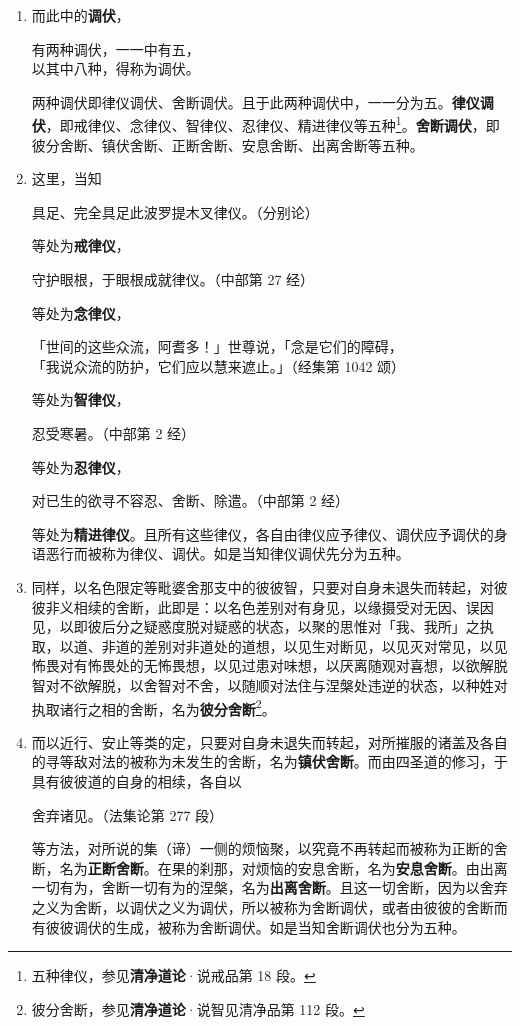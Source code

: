 \begin{enumerate}
\item 而此中的\textbf{调伏}，\begin{quoting}有两种调伏，一一中有五，\\以其中八种，得称为调伏。\end{quoting}两种调伏即律仪调伏、舍断调伏。且于此两种调伏中，一一分为五。\textbf{律仪调伏}，即戒律仪、念律仪、智律仪、忍律仪、精进律仪等五种\footnote{五种律仪，参见\textbf{清净道论}·说戒品第 18 段。}。\textbf{舍断调伏}，即彼分舍断、镇伏舍断、正断舍断、安息舍断、出离舍断等五种。
\item 这里，当知\begin{quoting}具足、完全具足此波罗提木叉律仪。（分别论）\end{quoting}等处为\textbf{戒律仪}，\begin{quoting}守护眼根，于眼根成就律仪。（中部第 27 经）\end{quoting}等处为\textbf{念律仪}，\begin{quoting}「世间的这些众流，阿耆多！」世尊说，「念是它们的障碍，\\「我说众流的防护，它们应以慧来遮止。」（经集第 1042 颂）\end{quoting}等处为\textbf{智律仪}，\begin{quoting}忍受寒暑。（中部第 2 经）\end{quoting}等处为\textbf{忍律仪}，\begin{quoting}对已生的欲寻不容忍、舍断、除遣。（中部第 2 经）\end{quoting}等处为\textbf{精进律仪}。且所有这些律仪，各自由律仪应予律仪、调伏应予调伏的身语恶行而被称为律仪、调伏。如是当知律仪调伏先分为五种。
\item 同样，以名色限定等毗婆舍那支中的彼彼智，只要对自身未退失而转起，对彼彼非义相续的舍断，此即是：以名色差别对有身见，以缘摄受对无因、误因见，以即彼后分之疑惑度脱对疑惑的状态，以聚的思惟对「我、我所」之执取，以道、非道的差别对非道处的道想，以见生对断见，以见灭对常见，以见怖畏对有怖畏处的无怖畏想，以见过患对味想，以厌离随观对喜想，以欲解脱智对不欲解脱，以舍智对不舍，以随顺对法住与涅槃处违逆的状态，以种姓对执取诸行之相的舍断，名为\textbf{彼分舍断}\footnote{彼分舍断，参见\textbf{清净道论}·说智见清净品第 112 段。}。
\item 而以近行、安止等类的定，只要对自身未退失而转起，对所摧服的诸盖及各自的寻等敌对法的被称为未发生的舍断，名为\textbf{镇伏舍断}。而由四圣道的修习，于具有彼彼道的自身的相续，各自以\begin{quoting}舍弃诸见。（法集论第 277 段）\end{quoting}等方法，对所说的集（谛）一侧的烦恼聚，以究竟不再转起而被称为正断的舍断，名为\textbf{正断舍断}。在果的刹那，对烦恼的安息舍断，名为\textbf{安息舍断}。由出离一切有为，舍断一切有为的涅槃，名为\textbf{出离舍断}。且这一切舍断，因为以舍弃之义为舍断，以调伏之义为调伏，所以被称为舍断调伏，或者由彼彼的舍断而有彼彼调伏的生成，被称为舍断调伏。如是当知舍断调伏也分为五种。

\end{enumerate}
